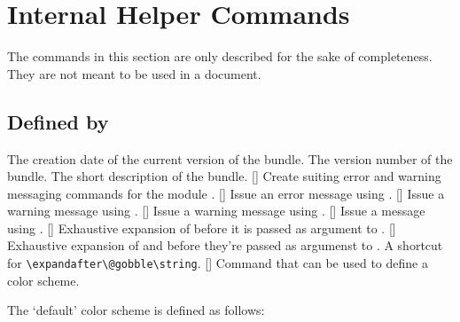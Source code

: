 \documentclass[load-preamble]{cnltx-doc}
\makeatletter
\def\cnltxbase{\cnltx@package@name@format{cnltx-base}}
\makeatother
\begin{document}

\section{Internal Helper Commands}

The commands in this section are only described for the sake of completeness.
They are not meant to be used in a document.

\subsection{Defined by \cnltxbase}

\begin{commands}
    The creation date of the current version of the bundle.
    The version number of the bundle.
    The short description of the bundle.
    []
    Create suiting error and warning messaging commands for the module
    .
  []
    Issue an error message using .
  []
    Issue a warning message using .
    []
    Issue a warning message using .
  []
    Issue a message using .
  []
    Exhaustive expansion of  before it is passed as argument to
    .
  []
    Exhaustive expansion of  and  before
    they're passed as argumenst to .
    A shortcut for \lstinline[style=cnltx]+\expandafter\@gobble\string+.
  []
    Command that can be used to define a color scheme.
\end{commands}

The `default' color scheme is defined as follows:
\begin{sourcecode}
\end{sourcecode}
\end{document}
